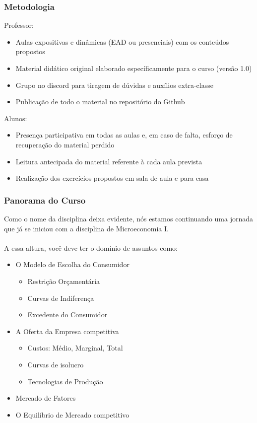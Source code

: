 \documentclass{beamer}[10]
\begin{document}
\begin{frame}
	\frametitle{Metodologia}
	
	Professor:
	\begin{itemize}
		\item Aulas expositivas e dinâmicas (EAD ou presenciais) com os conteúdos propostos
		\item Material didático original elaborado específicamente para o curso (versão 1.0)
		\item Grupo no discord para tiragem de dúvidas e auxílios extra-classe
		\item Publicação de todo o material no repositório do Github
	\end{itemize}

	Alunos:
	\begin{itemize}
		\item Presença participativa em todas as aulas e, em caso de falta, esforço de recuperação do material perdido
		\item Leitura antecipada do material referente à cada aula prevista
		\item Realização dos exercícios propostos em sala de aula e para casa
	\end{itemize}

\end{frame}

\begin{frame}
	\frametitle{Panorama do Curso}

	Como o nome da disciplina deixa evidente, nós estamos continuando uma jornada que já se iniciou com a disciplina de Microeconomia I.
	\\~\\
	A essa altura, você deve ter o domínio de assuntos como:
	\begin{itemize}
		\item O Modelo de Escolha do Consumidor
		\begin{itemize}
			\item Restrição Orçamentária
			\item Curvas de Indiferença
			\item Excedente do Consumidor
		\end{itemize}
		\item A Oferta da Empresa competitiva
		\begin{itemize}
			\item Custos: Médio, Marginal, Total
			\item Curvas de isolucro
			\item Tecnologias de Produção 
		\end{itemize}
		\item Mercado de Fatores
		\item O Equilíbrio de Mercado competitivo
	\end{itemize}
\end{frame}
\end{document}
